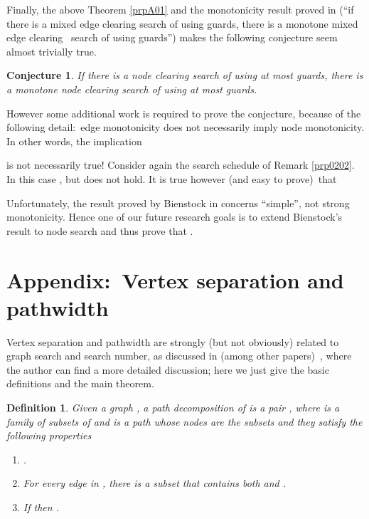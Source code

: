 \documentclass[11pt]{article}\usepackage{amsmath}
\newtheorem{conjecture}[theorem]{Conjecture}
\newtheorem{definition}[theorem]{Definition}
\begin{document}
Finally, the above Theorem \ref{prpA01} and the monotonicity result proved in
\cite{Bienstock} (\textquotedblleft if there is a mixed edge clearing search
of  using  guards, there is a monotone mixed edge clearing
\ search of  using  guards\textquotedblright) makes the
following conjecture seem almost trivially true.

\begin{conjecture}
\label{prpA02}If there is a node clearing search  of 
using at most  guards, there is a monotone node clearing search
 of  using at most  guards.
\end{conjecture}

However some additional work is required to prove the conjecture, because of
the following detail:\ edge monotonicity does not necessarily imply node
monotonicity. In other words, the implication

is not necessarily true! Consider again the search schedule of Remark
\ref{prp0202}. In this case , but  does not hold. It is true however (and easy to
prove)\ that



Unfortunately, the result proved by Bienstock in \cite{Bienstock} concerns
\textquotedblleft simple\textquotedblright, not strong monotonicity. Hence one
of our future research goals is to extend Bienstock's result to node search
and thus prove that .\newpage

\section{Appendix:\ Vertex separation and pathwidth}

\label{secC}

Vertex separation and pathwidth are strongly (but not obviously) related to
graph search and search number, as discussed in (among other
papers)\ \cite{Megiddo,FominThilikos}, where the author can find a more
detailed discussion; here we just give the basic definitions and the main theorem.

\begin{definition}
\label{def0204}Given a graph , a \emph{path
decomposition} of  is a pair , where
 is a family of subsets of  and  is a
path whose nodes are the subsets  and they satisfy the following properties

\begin{enumerate}
\item .

\item For every edge  in , there is a subset  that contains both
 and .

\item If  then .
\end{enumerate}
\end{definition}
\end{document}
